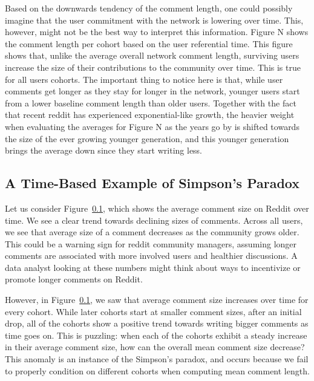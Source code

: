 Based on the downwards tendency of the comment length, one could possibly imagine that the user commitment with the network is lowering over time. This, however, might not be the best way to interpret this information. Figure N shows the comment length per cohort based on the user referential time. This figure shows that, unlike the average overall network comment length, surviving users increase the size of their contributions to the community over time. This is true for all users cohorts. The important thing to notice here is that, while user comments get longer as they stay for longer in the network, younger users start from a lower baseline comment length than older users. Together with the fact that recent reddit has experienced exponential-like growth, the heavier weight when evaluating the averages for Figure N as the years go by is shifted towards the size of the ever growing younger generation, and this younger generation brings the average down since they start writing less.

\subsection{A Time-Based Example of Simpson's Paradox}

Let us consider Figure~\ref{}, which shows the average comment size on Reddit over time. We see a clear trend towards declining sizes of comments.  Across all users, we see that average size of a comment decreases as the community grows older. This could be a warning sign for reddit community managers, assuming longer comments are associated with more involved users and healthier discussions. A data analyst looking at these numbers might think about ways to incentivize or promote longer comments on Reddit. 

However, in Figure~\ref{}, we saw that average comment size increases over time for every cohort. While later cohorts start at smaller comment sizes, after an initial drop, all of the cohorts show a positive trend towards writing bigger comments as time goes on.  This is puzzling: when each of the cohorts exhibit a steady increase in their average comment size, how can the overall mean comment size decrease?  This anomaly is an instance of the Simpson's paradox, and occurs because we fail to properly condition on different cohorts when computing mean comment length. 

